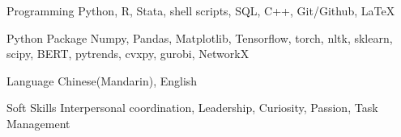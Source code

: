 

\begin{cvskills}

  \cvskill
    {Programming} %
    {Python, R, Stata, shell scripts, SQL, C++, Git/Github, \LaTeX} %

  \cvskill
    {Python Package} %
    {Numpy, Pandas, Matplotlib, Tensorflow, torch, nltk, sklearn, scipy, BERT, pytrends, cvxpy,
    gurobi, NetworkX}
    
  \cvskill
    {Language} %
    {Chinese(Mandarin), English} %
    
  \cvskill
    {Soft Skills} %
    {Interpersonal coordination, Leadership, Curiosity, Passion, Task Management} %

\end{cvskills}

